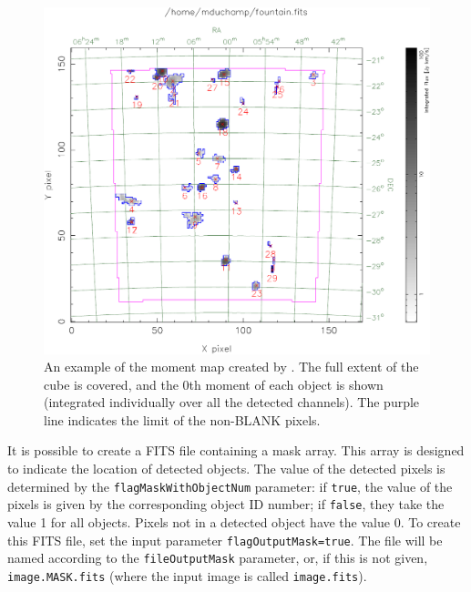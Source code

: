 \begin{figure}[!t]
  \begin{center}
    \includegraphics[width=\textwidth]{example_moment_map}
  \end{center}
  \caption{\footnotesize An example of the moment map created by
    \duchamp. The full extent of the cube is covered, and the 0th moment
    of each object is shown (integrated individually over all the
    detected channels). The purple line indicates the limit of the
    non-BLANK pixels.}
  \label{fig-moment}
\end{figure}

\label{sec-maskOut}

It is possible to create a FITS file containing a mask array. This
array is designed to indicate the location of detected objects. The
value of the detected pixels is determined by the
\texttt{flagMaskWithObjectNum} parameter: if \texttt{true}, the value
of the pixels is given by the corresponding object ID number; if
\texttt{false}, they take the value 1 for all objects. Pixels not in a
detected object have the value 0. To create this FITS file, set the
input parameter \texttt{flagOutputMask=true}. The file will be named
according to the \texttt{fileOutputMask} parameter, or, if this is not
given, \texttt{image.MASK.fits} (where the input image is called
\texttt{image.fits}).


